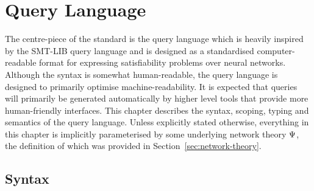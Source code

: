 \chapter{Query Language}
\label{sec:specification_language}

The centre-piece of the \vnnlib{} standard is the \vnnlib{} query language which is heavily inspired by the SMT-LIB query language and is designed as a standardised computer-readable format for expressing satisfiability problems over neural networks.
Although the syntax is somewhat human-readable, the query language is designed to primarily optimise machine-readability. 
It is expected that \vnnlib{} queries will primarily be generated automatically by higher level tools that provide more human-friendly interfaces.
This chapter describes the syntax, scoping, typing and semantics of the query language. Unless explicitly stated otherwise, everything in this chapter is implicitly parameterised by some underlying network theory $\Psi$, the definition of which was provided in Section~\ref{sec:network-theory}.

\section{Syntax}
\label{sec:syntax}

